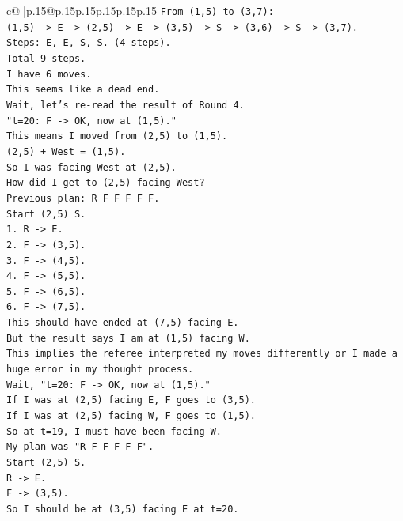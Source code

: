 \documentclass{article}
\begin{document}
{\begin{supertabular}{c@{$\;$}|p{.15\linewidth}@{}p{.15\linewidth}p{.15\linewidth}p{.15\linewidth}p{.15\linewidth}p{.15\linewidth}}
{{{\texttt{From (1,5) to (3,7):} \\
\texttt{(1,5) {-}> E {-}> (2,5) {-}> E {-}> (3,5) {-}> S {-}> (3,6) {-}> S {-}> (3,7).} \\
\texttt{Steps: E, E, S, S. (4 steps).} \\
\texttt{Total 9 steps.} \\
\texttt{I have 6 moves.} \\
\texttt{This seems like a dead end.} \\
\texttt{Wait, let's re{-}read the result of Round 4.} \\
\texttt{"t=20: F {-}> OK, now at (1,5)."} \\
\texttt{This means I moved from (2,5) to (1,5).} \\
\texttt{(2,5) + West = (1,5).} \\
\texttt{So I was facing West at (2,5).} \\
\texttt{How did I get to (2,5) facing West?} \\
\texttt{Previous plan: R F F F F F.} \\
\texttt{Start (2,5) S.} \\
\texttt{1. R {-}> E.} \\
\texttt{2. F {-}> (3,5).} \\
\texttt{3. F {-}> (4,5).} \\
\texttt{4. F {-}> (5,5).} \\
\texttt{5. F {-}> (6,5).} \\
\texttt{6. F {-}> (7,5).} \\
\texttt{This should have ended at (7,5) facing E.} \\
\texttt{But the result says I am at (1,5) facing W.} \\
\texttt{This implies the referee interpreted my moves differently or I made a huge error in my thought process.} \\
\texttt{Wait, "t=20: F {-}> OK, now at (1,5)."} \\
\texttt{If I was at (2,5) facing E, F goes to (3,5).} \\
\texttt{If I was at (2,5) facing W, F goes to (1,5).} \\
\texttt{So at t=19, I must have been facing W.} \\
\texttt{My plan was "R F F F F F".} \\
\texttt{Start (2,5) S.} \\
\texttt{R {-}> E.} \\
\texttt{F {-}> (3,5).} \\
\texttt{So I should be at (3,5) facing E at t=20.} \\
}}}
\end{supertabular}}
\end{document}
